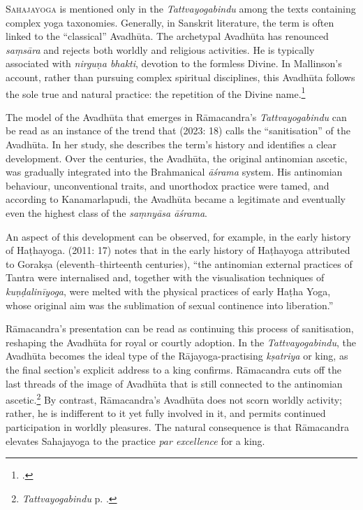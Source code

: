 \lettrine{S}{ahajayoga} is mentioned only in the \emph{Tattvayogabindu} among the texts containing complex yoga taxonomies. Generally, in Sanskrit literature, the term is often linked to the ``classical'' Avadhūta. The archetypal Avadhūta has renounced \textit{saṃsāra} and rejects both worldly and religious activities. He is typically associated with \textit{nirguṇa bhakti}, devotion to the formless Divine. In Mallinson's account, rather than pursuing complex spiritual disciplines, this Avadhūta follows the sole true and natural practice: the repetition of the Divine name.\footnote{\citeauthor[2011: 15]{mallinsonnath}.}

The model of the Avadhūta that emerges in Rāmacandra's \emph{Tattvayogabindu} can be read as an instance of the trend that \citeauthor{pudi2023} (2023: 18) calls the ``sanitisation'' of the Avadhūta. In her study, she describes the term's history and identifies a clear development. Over the centuries, the Avadhūta, the original antinomian ascetic, was gradually integrated into the Brahmanical \emph{āśrama} system. His antinomian behaviour, unconventional traits, and unorthodox practice were tamed, and according to Kanamarlapudi, the Avadhūta became a legitimate and eventually even the highest class of the \textit{saṃnyāsa āśrama}.

An aspect of this development can be observed, for example, in the early history of Haṭhayoga. \citeauthor{mallinsonnath} (2011: 17) notes that in the early history of Haṭhayoga attributed to Gorakṣa (eleventh–thirteenth centuries), ``the antinomian external practices of Tantra were internalised and, together with the visualisation techniques of \textit{kuṇḍalinīyoga}, were melted with the physical practices of early Haṭha Yoga, whose original aim was the sublimation of sexual continence into liberation.''

Rāmacandra's presentation can be read as continuing this process of sanitisation, reshaping the Avadhūta for royal or courtly adoption. In the \emph{Tattvayogabindu}, the Avadhūta becomes the ideal type of the Rājayoga-practising \emph{kṣatriya} or king, as the final section's explicit address to a king confirms. Rāmacandra cuts off the last threads of the image of Avadhūta that is still connected to the antinomian ascetic.\footnote{\emph{Tattvayogabindu}  p. \pageref{avadhuta}.} By contrast, Rāmacandra's Avadhūta does not scorn worldly activity; rather, he is indifferent to it yet fully involved in it, and permits continued participation in worldly pleasures. The natural consequence is that Rāmacandra elevates Sahajayoga to the practice \textit{par excellence} for a king.  

